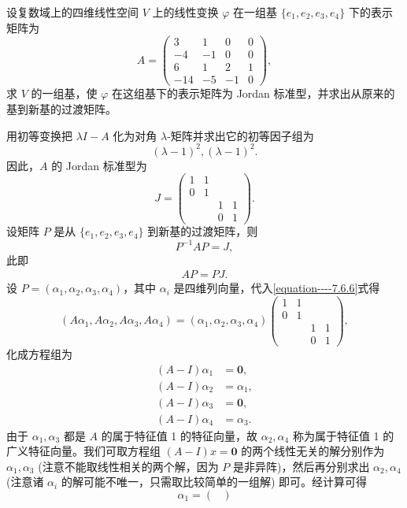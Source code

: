 \documentclass[../../main.tex]{subfiles}
\begin{document}
\begin{example}
设复数域上的四维线性空间 $V$ 上的线性变换 $\varphi$ 在一组基 $\{e_1,e_2,e_3,e_4\}$ 下的表示矩阵为
\[
A = \begin{pmatrix}
3 & 1 & 0 & 0 \\
-4 & -1 & 0 & 0 \\
6 & 1 & 2 & 1 \\
-14 & -5 & -1 & 0
\end{pmatrix},
\]
求 $V$ 的一组基，使 $\varphi$ 在这组基下的表示矩阵为 Jordan 标准型，并求出从原来的基到新基的过渡矩阵。
\end{example}
\begin{solution}
用初等变换把 $\lambda I - A$ 化为对角 $\lambda$-矩阵并求出它的初等因子组为
\[
(\lambda - 1)^2, (\lambda - 1)^2.
\]
因此，$A$ 的 Jordan 标准型为
\[
J = \begin{pmatrix}
1 & 1 & & \\
0 & 1 & & \\
& & 1 & 1 \\
& & 0 & 1
\end{pmatrix}.
\]
设矩阵 $P$ 是从 $\{e_1,e_2,e_3,e_4\}$ 到新基的过渡矩阵，则
\[
P^{-1}AP = J,
\]
此即
\begin{align}
AP = PJ.\label{equation----7.6.6}
\end{align}
设 $P = (\alpha_1,\alpha_2,\alpha_3,\alpha_4)$，其中 $\alpha_i$ 是四维列向量，代入\eqref{equation----7.6.6}式得
\[
(A\alpha_1,A\alpha_2,A\alpha_3,A\alpha_4) = (\alpha_1,\alpha_2,\alpha_3,\alpha_4)\begin{pmatrix}
1 & 1 & & \\
0 & 1 & & \\
& & 1 & 1 \\
& & 0 & 1
\end{pmatrix},
\]
化成方程组为
\begin{align*}
(A - I)\alpha_1 &= \mathbf{0},\\
(A - I)\alpha_2 &= \alpha_1,\\
(A - I)\alpha_3 &= \mathbf{0},\\
(A - I)\alpha_4 &= \alpha_3.
\end{align*}
由于 $\alpha_1,\alpha_3$ 都是 $A$ 的属于特征值 1 的特征向量，故 $\alpha_2,\alpha_4$ 称为属于特征值 1 的广义特征向量。我们可取方程组 $(A - I)x = \mathbf{0}$ 的两个线性无关的解分别作为 $\alpha_1,\alpha_3$ (注意不能取线性相关的两个解，因为 $P$ 是非异阵)，然后再分别求出 $\alpha_2,\alpha_4$ (注意诸 $\alpha_i$ 的解可能不唯一，只需取比较简单的一组解) 即可。经计算可得
\[
\alpha_1 = \begin{pmatrix}

\end{pmatrix}\]
\end{solution}
\end{document}
